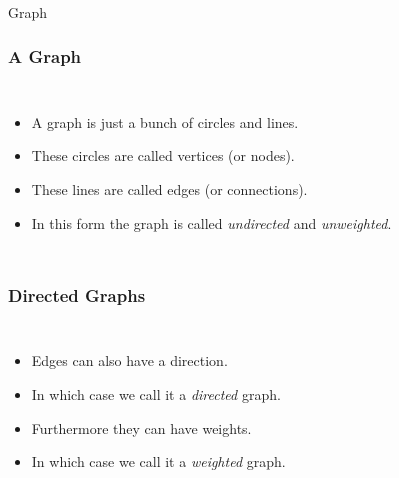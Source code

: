 \begin{frame}[fragile]\frametitle{}
\begin{center}
{\Large Graph}
\end{center}

\end{frame}

\begin{frame}
	\frametitle{A Graph}

	\begin{columns}[T]
		
		\begin{itemize}
			\item A graph is just a bunch of circles and lines.
				
			\item These circles are called \alert{vertices} (or \alert{nodes}).
				
			\item These lines are called \alert{edges} (or \alert{connections}).
				
			\item In this form the graph is called \textit{undirected} and \textit{unweighted}.
		\end{itemize}
	\end{columns}
\end{frame}

\begin{frame}
	\frametitle{Directed Graphs}
	
	\begin{columns}[T]

			

			

		\begin{itemize}
			\item Edges can also have a direction.
			\item In which case we call it a \textit{directed} graph.
				
			\item Furthermore they can have weights.
			\item In which case we call it a \textit{weighted} graph.
		\end{itemize}
	\end{columns}
\end{frame}

